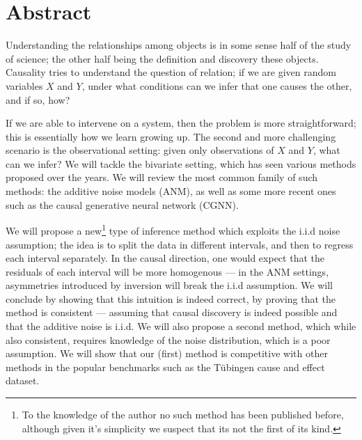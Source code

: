 

\cleardoublepage
\chapter*{Abstract}
\vspace{0.2\textheight}

Understanding the relationships among objects is in some sense half of the study of science; the other 
half being the definition and discovery these objects. Causality tries to understand the question of 
relation; if we are given random variables $X$ and $Y$, under what conditions can we infer that 
one causes the other, and if so, how? 


If we are able to intervene on a system, then the problem is more straightforward; this is essentially
how we learn growing up. The second and more challenging scenario is the observational setting: given 
only observations of $X$ and $Y$, what can we infer? We will tackle the bivariate setting, which has 
seen various methods proposed over the years. We will review the most common family of such methods: 
the additive noise models (ANM), as well as some more recent ones such as the causal generative neural 
network (CGNN). 

We will propose a new\footnote{To the knowledge of the author no such method has been published 
before, although given it's simplicity we suspect that its not the first of its kind.} 
type of inference method which exploits the i.i.d 
noise assumption; the idea is to split the data in different intervals, and then to regress each 
interval separately. In the causal direction, one would expect that the residuals of each 
interval will be more homogenous --- in the ANM settings, asymmetries introduced
by inversion will break the i.i.d assumption. We will conclude by 
showing that this intuition is indeed correct, by proving that the method is consistent --- 
assuming that causal discovery is indeed possible and that the additive noise is i.i.d. We will
also propose a second method, which while also consistent, requires knowledge of the 
noise distribution, which is a poor assumption. We will show that our (first) method is competitive with 
other methods in the popular benchmarks such as the Tübingen cause and effect dataset. 




